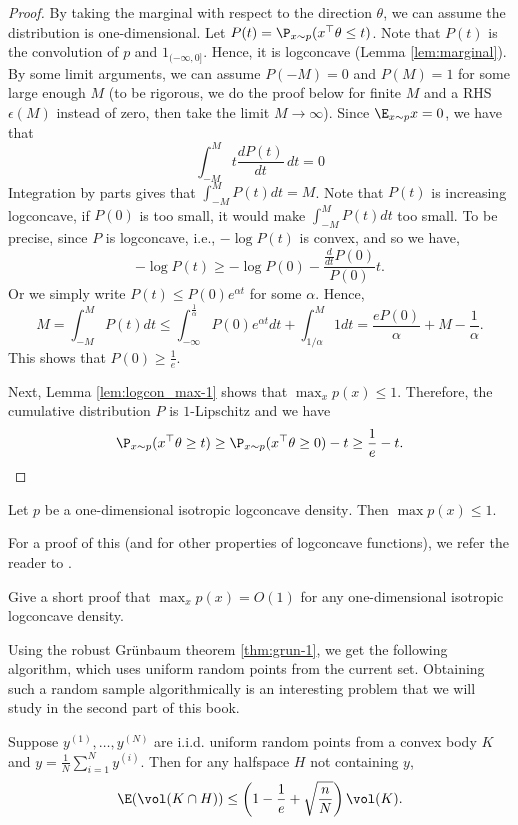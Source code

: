 \begin{proof}
By taking the marginal with respect to the direction $\theta$, we
can assume the distribution is one-dimensional. Let $P(t)=\P_{x\sim p}(x^{\top}\theta\le t)$.
Note that $P(t)$ is the convolution of $p$ and $1_{(-\infty,0]}$.
Hence, it is logconcave (Lemma \ref{lem:marginal}). By some limit
arguments, we can assume $P(-M)=0$ and $P(M)=1$ for some large enough
$M$ (to be rigorous, we do the proof below for finite $M$ and a
RHS $\epsilon(M)$ instead of zero, then take the limit $M\rightarrow\infty$).
Since $\E_{x\sim p}x=0$, we have that
\[
\int_{-M}^{M}t\frac{dP(t)}{dt}\,dt=0
\]
Integration by parts gives that $\int_{-M}^{M}P(t)dt=M$. Note that
$P(t)$ is increasing logconcave, if $P(0)$ is too small, it would
make $\int_{-M}^{M}P(t)dt$ too small. To be precise, since $P$ is
logconcave, i.e., $-\log P(t)$ is convex, and so we have,
\[
-\log P(t)\geq-\log P(0)-\frac{\frac{d}{dt}P(0)}{P(0)}t.
\]
Or we simply write $P(t)\leq P(0)e^{\alpha t}$ for some $\alpha$.
Hence,
\[
M=\int_{-M}^{M}P(t)dt\leq\int_{-\infty}^{\frac{1}{\alpha}}P(0)e^{\alpha t}dt+\int_{1/\alpha}^{M}1dt=\frac{eP(0)}{\alpha}+M-\frac{1}{\alpha}.
\]
This shows that $P(0)\geq\frac{1}{e}$.

Next, Lemma \ref{lem:logcon_max-1} shows that $\max_{x}p(x)\le1$.
Therefore, the cumulative distribution $P$ is $1$-Lipschitz and
we have
\[
\P_{x\sim p}(x^{\top}\theta\geq t)\ge\P_{x\sim p}(x^{\top}\theta\geq0)-t\geq\frac{1}{e}-t.
\]
\end{proof}
\begin{lem}
\label{lem:logcon_max-1}Let $p$ be a one-dimensional isotropic logconcave
density$.$ Then $\max p(x)\le1$.
\end{lem}

For a proof of this (and for other properties of logconcave functions),
we refer the reader to \cite{lovasz2007geometry}.
\begin{xca}
Give a short proof that $\max_{x}p(x)=O(1)$ for any one-dimensional
isotropic logconcave density.
\end{xca}

Using the robust Gr\"unbaum theorem \ref{thm:grun-1}, we get the
following algorithm, which uses uniform random points from the current
set. Obtaining such a random sample algorithmically is an interesting
problem that we will study in the second part of this book.
\begin{lem}
Suppose $y^{(1)},\ldots,y^{(N)}$ are i.i.d. uniform random points
from a convex body $K$ and $y=\frac{1}{N}\sum_{i=1}^{N}y^{(i)}$.
Then for any halfspace $H$ not containing $y$, 
\[
\E(\vol(K\cap H))\le\left(1-\frac{1}{e}+\sqrt{\frac{n}{N}}\right)\vol(K).
\]
\end{lem}

